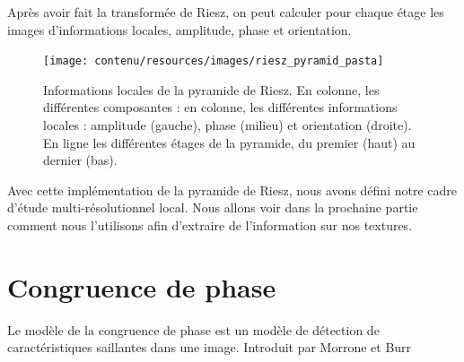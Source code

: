 Après avoir fait la transformée de Riesz, on peut calculer pour chaque étage les images d'informations locales, amplitude, phase et orientation.

\begin{figure}
    \centering
    \texttt{[image: contenu/resources/images/riesz\_pyramid\_pasta]}
    \caption[Informations locales de la pyramide de Riesz]{Informations locales de la pyramide de Riesz. En colonne, les différentes composantes : en colonne, les différentes informations locales : amplitude (gauche), phase (milieu) et orientation (droite). En ligne les différentes étages de la pyramide, du premier (haut) au dernier (bas).}
    \label{fig:riesz-pyramid-local}
\end{figure}

Avec cette implémentation de la pyramide de Riesz, nous avons défini notre cadre d'étude multi-résolutionnel local. Nous allons voir dans la prochaine partie comment nous l'utilisons afin d'extraire de l'information sur nos textures.

\section{Congruence de phase}

Le modèle de la congruence de phase est un modèle de détection de caractéristiques saillantes dans une image. Introduit par Morrone et Burr~\cite{concetta_morrone_feature_1997}